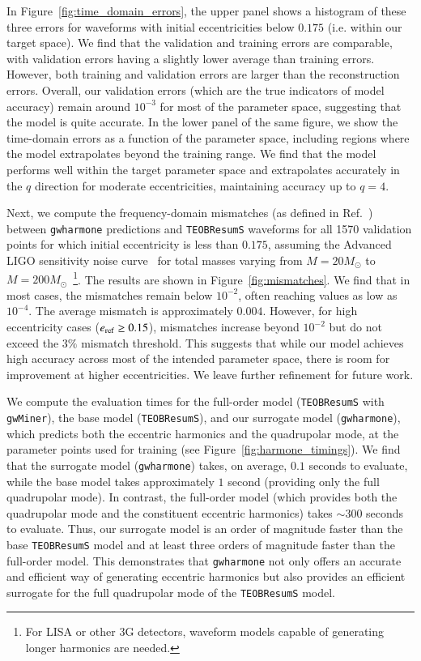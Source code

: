 \documentclass[aps,prd,amsmath,floats,floatfix, twocolumn,
superscriptaddress,nofootinbib,showpacs,longbibliography]{revtex4-1}
\begin{document}
In Figure~\ref{fig:time_domain_errors}, the upper panel shows a histogram of these three errors for waveforms with initial eccentricities below $0.175$ (i.e. within our target space). We find that the validation and training errors are comparable, with validation errors having a slightly lower average than training errors. However, both training and validation errors are larger than the reconstruction errors. Overall, our validation errors (which are the true indicators of model accuracy) remain around $10^{-3}$ for most of the parameter space, suggesting that the model is quite accurate. In the lower panel of the same figure, we show the time-domain errors as a function of the parameter space, including regions where the model extrapolates beyond the training range. We find that the model performs well within the target parameter space and extrapolates accurately in the $q$ direction for moderate eccentricities, maintaining accuracy up to $q=4$.

Next, we compute the frequency-domain mismatches (as defined in Ref.~\cite{Cutler:1994ys}) between \texttt{gwharmone} predictions and \texttt{TEOBResumS} waveforms for all 1570 validation points for which initial eccentricity is less than $0.175$, assuming the Advanced LIGO sensitivity noise curve~\cite{KAGRA:2013rdx} for total masses varying from $M=20M_{\odot}$ to $M=200M_{\odot}$~\footnote{For LISA or other 3G detectors, waveform models capable of generating longer harmonics are needed.}. The results are shown in Figure~\ref{fig:mismatches}. 
We find that in most cases, the mismatches remain below $10^{-2}$, often reaching values as low as $10^{-4}$. The average mismatch is approximately $0.004$. However, for high eccentricity cases ($e_{\rm ref} \geq 0.15$), mismatches increase beyond $10^{-2}$ but do not exceed the $3\%$ mismatch threshold. This suggests that while our model achieves high accuracy across most of the intended parameter space, there is room for improvement at higher eccentricities. We leave further refinement for future work.

We compute the evaluation times for the full-order model (\texttt{TEOBResumS} with \texttt{gwMiner}), the base model (\texttt{TEOBResumS}), and our surrogate model (\texttt{gwharmone}), which predicts both the eccentric harmonics and the quadrupolar mode, at the parameter points used for training (see Figure~\ref{fig:harmone_timings}). We find that the surrogate model (\texttt{gwharmone}) takes, on average, $0.1$ seconds to evaluate, while the base model takes approximately $1$ second (providing only the full quadrupolar mode). In contrast, the full-order model (which provides both the quadrupolar mode and the constituent eccentric harmonics) takes $\sim 300$ seconds to evaluate. Thus, our surrogate model is an order of magnitude faster than the base \texttt{TEOBResumS} model and at least three orders of magnitude faster than the full-order model. This demonstrates that \texttt{gwharmone} not only offers an accurate and efficient way of generating eccentric harmonics but also provides an efficient surrogate for the full quadrupolar mode of the \texttt{TEOBResumS} model.
\end{document}
